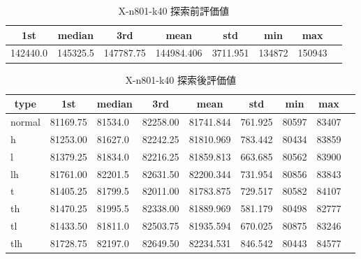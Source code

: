 \begin{table}[htbp]
    \caption{X-n801-k40 探索前評価値}
    \begin{tabular}{|l|l|l|l|l|l|l|l|}\hline
    \multicolumn{1}{|c|}{\textbf{1st}}
    &\multicolumn{1}{c|}{\textbf{median}}
    &\multicolumn{1}{c|}{\textbf{3rd}}
    &\multicolumn{1}{c|}{\textbf{mean}}
    &\multicolumn{1}{c|}{\textbf{std}}
    &\multicolumn{1}{c|}{\textbf{min}}
    &\multicolumn{1}{c|}{\textbf{max}}\\\hline
	142440.0 & 145325.5 & 147787.75 & 144984.406 & 3711.951 & 134872 & 150943\\\hline
	\end{tabular}
\end{table}
\begin{table}[htbp]
    \caption{X-n801-k40 探索後評価値}
    \begin{tabular}{|l|l|l|l|l|l|l|l|l|}\hline
    \multicolumn{1}{|c|}{\textbf{type}}
    &\multicolumn{1}{|c|}{\textbf{1st}}
    &\multicolumn{1}{c|}{\textbf{median}}
    &\multicolumn{1}{c|}{\textbf{3rd}}
    &\multicolumn{1}{c|}{\textbf{mean}}
    &\multicolumn{1}{c|}{\textbf{std}}
    &\multicolumn{1}{c|}{\textbf{min}}
    &\multicolumn{1}{c|}{\textbf{max}}\\\hline
	normal & 81169.75 & 81534.0 & 82258.00 & 81741.844 & 761.925 & 80597 & 83407\\\hline
	h & 81253.00 & 81627.0 & 82242.25 & 81810.969 & 783.442 & 80434 & 83859\\\hline
	l & 81379.25 & 81834.0 & 82216.25 & 81859.813 & 663.685 & 80562 & 83900\\\hline
	lh & 81761.00 & 82201.5 & 82631.50 & 82200.344 & 731.954 & 80856 & 83843\\\hline
	t & 81405.25 & 81799.5 & 82011.00 & 81783.875 & 729.517 & 80582 & 84107\\\hline
	th & 81470.25 & 81995.5 & 82338.00 & 81889.969 & 581.179 & 80498 & 82777\\\hline
	tl & 81433.50 & 81811.0 & 82503.75 & 81935.594 & 670.025 & 80875 & 83246\\\hline
	tlh & 81728.75 & 82197.0 & 82649.50 & 82234.531 & 846.542 & 80443 & 84577\\\hline
	\end{tabular}
\end{table}
